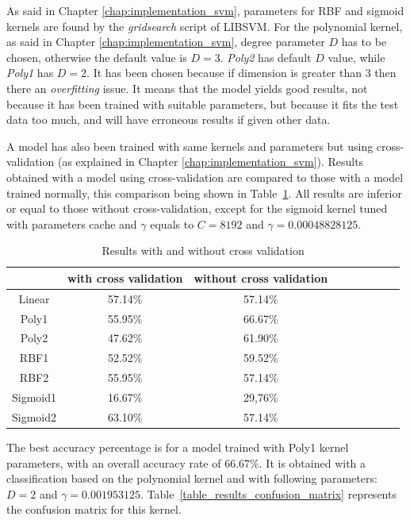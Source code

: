 \noindent As said in Chapter \ref{chap:implementation_svm}, parameters for RBF and sigmoid kernels are found by the \textit{gridsearch} script of LIBSVM. For the polynomial kernel, as said in Chapter \ref{chap:implementation_svm}, degree parameter $D$ has to be chosen, otherwise the default value is $D=3$. \textit{Poly2} has default $D$ value, while \textit{Poly1} has $D = 2$. It has been chosen because if dimension is greater than $3$ then there an \textit{overfitting} issue. It means that the model yields good results, not because it has been trained with suitable parameters, but because it fits the test data too much, and will have erroneous results if given other data.
\newline

\noindent A model has also been trained with same kernels and parameters but using cross-validation (as explained in Chapter \ref{chap:implementation_svm}). Results obtained with a model using cross-validation are compared to those with a model trained normally, this comparison being shown in  Table~\ref{table_results_crossvalidation}. All results are inferior or equal to those without cross-validation, except for the sigmoid kernel tuned with parameters cache and $\gamma$ equals to $ C = 8192 $ and $ \gamma = 0.00048828125 $.
\newline

\begin{table}[h]
\begin{center}
   \caption{\label{table_results_crossvalidation} Results with and without cross validation}
\begin{tabular}{|c|c|c|c|c|c|c|c|c|}
  \hline
    & with cross validation & without cross validation \\
  \hline
  Linear & 57.14\% & 57.14\% \\
  Poly1 & 55.95\% & 66.67\% \\
  Poly2 & 47.62\% & 61.90\% \\
  RBF1 & 52.52\% & 59.52\% \\
  RBF2 & 55.95\% & 57.14\% \\
  Sigmoid1 & 16.67\% & 29,76\% \\
  Sigmoid2 & 63.10\% & 57.14\% \\
  \hline
\end{tabular}
\end{center}
\end{table}

\noindent The best accuracy percentage is for a model trained with Poly1 kernel parameters, with an overall accuracy rate of $ 66.67\% $. It is obtained with a classification based on the polynomial kernel and with following parameters: $ D = 2 $ and $ \gamma = 0.001953125 $. Table~\ref{table_results_confusion_matrix} represents the confusion matrix for this kernel.
\newline

